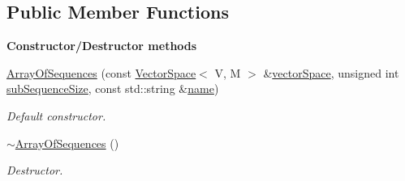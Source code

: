 \subsection*{Public Member Functions}
\begin{Indent}{\bf Constructor/\-Destructor methods}\par
\begin{DoxyCompactItemize}
\item 
\hyperlink{class_q_u_e_s_o_1_1_array_of_sequences_a8b4625170975168c1cb3ee34946e564b}{Array\-Of\-Sequences} (const \hyperlink{class_q_u_e_s_o_1_1_vector_space}{Vector\-Space}$<$ V, M $>$ \&\hyperlink{class_q_u_e_s_o_1_1_base_vector_sequence_af9a4dd979a2fa8dee85bb07793b59ba2}{vector\-Space}, unsigned int \hyperlink{class_q_u_e_s_o_1_1_array_of_sequences_a007d00d2398007b9bac82ed23eedb1e2}{sub\-Sequence\-Size}, const std\-::string \&\hyperlink{class_q_u_e_s_o_1_1_base_vector_sequence_a48f6fe02cf77f4233d3bcdfef3870f19}{name})
\begin{DoxyCompactList}\small\item\em Default constructor. \end{DoxyCompactList}\item 
\hyperlink{class_q_u_e_s_o_1_1_array_of_sequences_a8632bf1a4b6cd4447694a7108a2689a7}{$\sim$\-Array\-Of\-Sequences} ()
\begin{DoxyCompactList}\small\item\em Destructor. \end{DoxyCompactList}\end{DoxyCompactItemize}
\end{Indent}
